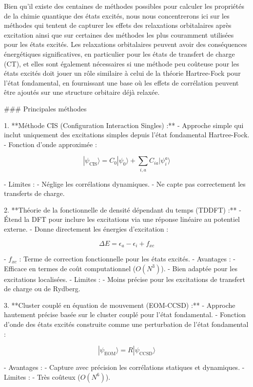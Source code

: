 \documentclass[12pt,a4paper]{report}
\begin{document}
\begin{markdown}
Bien qu'il existe des centaines de méthodes possibles pour calculer les propriétés de la chimie quantique des états excités, nous nous concentrerons ici sur les méthodes qui tentent de capturer les effets des relaxations orbitalaires après excitation ainsi que sur certaines des méthodes les plus couramment utilisées pour les états excités. Les relaxations orbitalaires peuvent avoir des conséquences énergétiques significatives, en particulier pour les états de transfert de charge (CT), et elles sont également nécessaires si une méthode peu coûteuse pour les états excités doit jouer un rôle similaire à celui de la théorie Hartree-Fock pour l'état fondamental, en fournissant une base où les effets de corrélation peuvent être ajoutés sur une structure orbitaire déjà relaxée.

### Principales méthodes

1. **Méthode CIS (Configuration Interaction Singles) :**
   - Approche simple qui inclut uniquement des excitations simples depuis l’état fondamental Hartree-Fock.
   - Fonction d’onde approximée :

\[
|\psi_{\text{CIS}}\rangle = C_0 |\psi_0\rangle + \sum_{i,a} C_{ia} |\psi_i^a\rangle
\]

   - Limites :
     - Néglige les corrélations dynamiques.
     - Ne capte pas correctement les transferts de charge.

2. **Théorie de la fonctionnelle de densité dépendant du temps (TDDFT) :**
   - Étend la DFT pour inclure les excitations via une réponse linéaire au potentiel externe.
   - Donne directement les énergies d'excitation :

\[
\Delta E = \epsilon_a - \epsilon_i + f_{xc}
\]

   - \(f_{xc}\) : Terme de correction fonctionnelle pour les états excités.
   - Avantages :
     - Efficace en termes de coût computationnel (\(O(N^3)\)).
     - Bien adaptée pour les excitations localisées.
   - Limites :
     - Moins précise pour les excitations de transfert de charge ou de Rydberg.

3. **Cluster couplé en équation de mouvement (EOM-CCSD) :**
   - Approche hautement précise basée sur le cluster couplé pour l’état fondamental.
   - Fonction d’onde des états excités construite comme une perturbation de l’état fondamental :

\[
|\psi_{\text{EOM}}\rangle = R |\psi_{\text{CCSD}}\rangle
\]

   - Avantages :
     - Capture avec précision les corrélations statiques et dynamiques.
   - Limites :
     - Très coûteux (\(O(N^6)\)).


\end{markdown}
\end{document}
